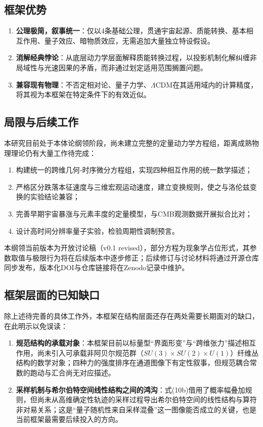 \documentclass[UTF8]{csoarticle}
\begin{document}
\subsection{框架优势}
\begin{enumerate}
\item \textbf{公理极简，叙事统一}：仅以4条基础公理，贯通宇宙起源、质能转换、基本相互作用、量子效应、暗物质效应，无需追加大量独立特设假设。
\item \textbf{消解经典悖论}：从底层动力学层面解释质能转换过程，以投影机制化解纠缠非局域性与光速因果的矛盾，而非通过划定适用范围搁置问题。
\item \textbf{兼容现有物理}：不否定相对论、量子力学、$\Lambda$CDM在其适用域内的计算精度，将其视为本框架在特定条件下的有效近似。
\end{enumerate}

\subsection{局限与后续工作}
本研究目前处于本体论纲领阶段，尚未建立完整的定量动力学方程组，距离成熟物理理论仍有大量工作待完成：
\begin{enumerate}
\item 构建统一的跨维几何‑时序微分方程组，实现四种相互作用的统一数学描述；
\item 严格区分跌落本征速度与三维宏观运动速度，建立变换规则，使之与洛伦兹变换的实验结论兼容；
\item 完善早期宇宙暴涨与元素丰度的定量模型，与CMB观测数据开展拟合比对；
\item 设计高时间分辨率量子实验，检验周期性调制预言。
\end{enumerate}

本纲领当前版本为开放讨论稿（v0.1 revised），部分方程为现象学占位形式，其参数取值与极限行为将在后续版本中逐步修正；后续修订与讨论材料将通过开源仓库同步发布，版本化DOI与仓库链接将在Zenodo记录中维护。

\subsection{框架层面的已知缺口}
除上述待完善的具体工作外，本框架在结构层面还存在两处需要长期面对的缺口，在此明示以免误读：
\begin{enumerate}
\item \textbf{规范结构的承载对象}：本框架目前以标量型“界面形变”与“跨维张力”描述相互作用，尚未引入可承载非阿贝尔规范群（$SU(3)\times SU(2)\times U(1)$）纤维丛结构的数学对象；四种力的强度排序在通道图像下有定性叙事，但规范耦合常数的跑动与汇合尚无对应描述。
\item \textbf{采样机制与希尔伯特空间线性结构之间的鸿沟}：式(10b)借用了概率幅叠加规则，但尚未从高维确定性轨迹的采样过程导出希尔伯特空间的线性结构与算符非对易关系；这是“量子随机性来自采样混叠”这一图像能否成立的关键，也是当前框架最需要后续投入的方向。
\end{enumerate}
\end{document}
